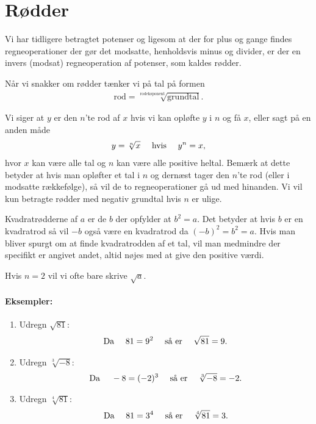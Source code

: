 \section{Rødder}
\noindent Vi har tidligere betragtet potenser og ligesom at der for plus og gange findes regneoperationer der gør det modsatte, henholdsvis minus og divider, er der en invers (modsat) regneoperation af potenser, som kaldes rødder. 

Når vi snakker om rødder tænker vi på tal på formen
\begin{align*}
\mathrm{rod} = \sqrt[\mathrm{rodeksponent}]{\mathrm{grundtal}}.
\end{align*}


Vi siger at $y$ er den $n$'te rod af $x$ hvis vi kan opløfte $y$ i $n$ og få $x$, eller sagt på en anden måde
\begin{align*}
y=\sqrt[n]{x} \quad \textup{ hvis } \quad  y^n=x,
\end{align*}
hvor $x$ kan være alle tal og $n$ kan være alle positive heltal. Bemærk at dette betyder at hvis man opløfter et tal i $n$ og dernæst tager den $n$'te rod (eller i modsatte rækkefølge), så vil de to regneoperationer gå ud med hinanden. Vi vil kun betragte rødder med negativ grundtal hvis $n$ er ulige.

Kvadratrødderne af $a$ er de $b$ der opfylder at $b^2=a$. Det betyder at hvis $b$ er en kvadratrod så vil $-b$ også være en kvadratrod da $(-b)^2=b^2=a$. Hvis man bliver spurgt om at finde kvadratrodden af et tal, vil man medmindre der specifikt er angivet andet, altid nøjes med at give den positive værdi.

Hvis $n=2$ vil vi ofte bare skrive $\sqrt{a}$.
\paragraph*{Eksempler:}
\begin{enumerate}
\item Udregn $\sqrt{81}$:
\begin{align*}
\textup{Da } \quad 81=9^2 \quad \textup{ så er } \quad \sqrt{81}=9. 
\end{align*}
\item Udregn $\sqrt[3]{-8}$:
\begin{align*}
\textup{Da } \quad -8=(-2)^3 \quad \textup{ så er } \quad \sqrt[3]{-8}=-2. 
\end{align*}
\item Udregn $\sqrt[4]{81}$:
\begin{align*}
\textup{Da } \quad 81=3^4 \quad \textup{ så er } \quad \sqrt[4]{81}=3. 
\end{align*}
\end{enumerate}

